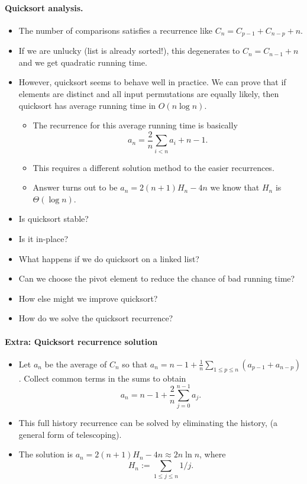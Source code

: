 \paragraph{Quicksort analysis.}
\begin{itemize}
\item The number of comparisons satisfies a recurrence like 
$C_n = C_{p-1} + C_{n - p} + n$.
\item If we are unlucky (list is already sorted!), this degenerates to 
$C_{n} = C_{n-1} + n$ and we get quadratic running time.
\item However, quicksort seems to behave well in practice. We can prove that 
if elements are distinct and all input permutations are equally likely, then 
quicksort has average running time in $O(n \log n)$.
\begin{itemize}
\item The recurrence for this average running time is basically
$$ a_n = \frac{2}{n} \sum_{i<n} a_i + n-1. $$ 
\item This requires a different solution method to the easier recurrences.
\item  Answer turns out to be $a_n = 2 (n + 1) H_n - 4n$ we know 
that $H_n$ is $\Theta(\log n)$.
\end{itemize}
\end{itemize}

\begin{itemize}
\item Is quicksort stable?
\item Is it in-place?
\item What happens if we do quicksort on a linked list?
\item Can we choose the pivot element to reduce the chance of bad running time?
\item How else might we improve quicksort?
\item How do we solve the quicksort recurrence?
\end{itemize}

\paragraph{Extra: Quicksort recurrence solution}
\begin{itemize}
\item Let $a_n$ be the average of $C_n$ so that 
$a_n = n - 1 + \frac{1}{n} \sum_{1\leq p \leq n} (a_{p-1} + a_{n-p})$. 
Collect common terms in the sums to obtain
$$a_n = n - 1 + \frac{2}{n} \sum_{j=0}^{n-1} a_j.$$ 
\item This \alert{full history} recurrence can be solved by 
\alert{eliminating the history}, (a general form of \alert{telescoping}). 
\item The solution is 
$a_n = 2 (n + 1) H_n - 4n \approx 2 n \ln n$, where 
$$H_n:= \sum_{1\leq j \leq n} 1/j.$$ 
\end{itemize}

